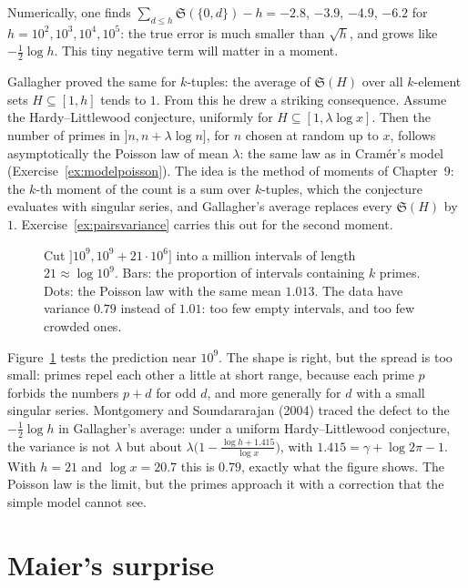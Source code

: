 Numerically, one finds $\sum_{d\le h}\mathfrak S(\{0,d\})-h=-2.8$, $-3.9$, $-4.9$, $-6.2$ for $h=10^2,10^3,10^4,10^5$: the true error is much smaller than $\sqrt h$, and grows like $-\frac12\log h$. This
tiny negative term will matter in a moment.

Gallagher proved the same for $k$-tuples: the average of $\mathfrak S(H)$ over all $k$-element sets $H\subseteq[1,h]$ tends to $1$. From this he drew a striking consequence. Assume the Hardy--Littlewood conjecture,
uniformly for $H\subseteq[1,\lambda\log x]$. Then the number of primes in $]n,n+\lambda\log n]$, for $n$ chosen at random up to $x$, follows asymptotically the Poisson law of mean $\lambda$: the
same law as in Cramér's model (Exercise~\ref{ex:modelpoisson}). The idea is the method of moments of Chapter~9: the $k$-th moment of the count is a sum over $k$-tuples, which the conjecture evaluates
with singular series, and Gallagher's average replaces every $\mathfrak S(H)$ by $1$. Exercise~\ref{ex:pairsvariance} carries this out for the second moment.

\begin{figure}[ht]
\centering
{}
\caption{Cut $]10^9,10^9+21\cdot10^6]$ into a million intervals of length $21\approx\log10^9$. Bars: the proportion of intervals containing $k$ primes. Dots: the Poisson law with the same mean $1.013$. The data have
variance $0.79$ instead of $1.01$: too few empty intervals, and too few crowded ones.}
\label{fig:poisson}
\end{figure}

Figure~\ref{fig:poisson} tests the prediction near $10^9$. The shape is right, but the spread is too small: primes repel each other a little at short range, because each prime $p$ forbids the
numbers $p+d$ for odd $d$, and more generally for $d$ with a small singular series. Montgomery and Soundararajan (2004) traced the defect to the $-\frac12\log h$ in Gallagher's average:
under a uniform Hardy--Littlewood conjecture, the variance is not $\lambda$ but about $\lambda\bigl(1-\frac{\log h+1.415}{\log x}\bigr)$, with $1.415=\gamma+\log2\pi-1$. With $h=21$ and $\log x=20.7$ this is $0.79$,
exactly what the figure shows. The Poisson law is the limit, but the primes approach it with a correction that the simple model cannot see.

\section{Maier's surprise}

